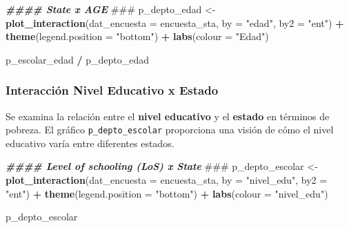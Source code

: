 \documentclass[
  12pt,
]{book}
\newenvironment{Shaded}{\begin{snugshade}}{\end{snugshade}}
\newcommand{\AlertTok}[1]{\textcolor[rgb]{0.94,0.16,0.16}{#1}}
\newcommand{\AttributeTok}[1]{\textcolor[rgb]{0.13,0.29,0.53}{#1}}
\newcommand{\DocumentationTok}[1]{\textcolor[rgb]{0.56,0.35,0.01}{\textbf{\textit{#1}}}}
\newcommand{\FunctionTok}[1]{\textcolor[rgb]{0.13,0.29,0.53}{\textbf{#1}}}
\newcommand{\NormalTok}[1]{#1}
\newcommand{\OtherTok}[1]{\textcolor[rgb]{0.56,0.35,0.01}{#1}}
\newcommand{\SpecialCharTok}[1]{\textcolor[rgb]{0.81,0.36,0.00}{\textbf{#1}}}
\newcommand{\StringTok}[1]{\textcolor[rgb]{0.31,0.60,0.02}{#1}}
\begin{document}
\begin{Shaded}
\begin{Highlighting}[]
\DocumentationTok{\#\#\#\# State x AGE }\AlertTok{\#\#\#}
\NormalTok{p\_depto\_edad }\OtherTok{\textless{}{-}}
  \FunctionTok{plot\_interaction}\NormalTok{(}\AttributeTok{dat\_encuesta =}\NormalTok{ encuesta\_sta,}
                   \AttributeTok{by =} \StringTok{"edad"}\NormalTok{,}
                   \AttributeTok{by2 =} \StringTok{"ent"}\NormalTok{) }\SpecialCharTok{+}
  \FunctionTok{theme}\NormalTok{(}\AttributeTok{legend.position =} \StringTok{"bottom"}\NormalTok{) }\SpecialCharTok{+} \FunctionTok{labs}\NormalTok{(}\AttributeTok{colour =} \StringTok{"Edad"}\NormalTok{)}

\NormalTok{p\_escolar\_edad }\SpecialCharTok{/}\NormalTok{ p\_depto\_edad}
\end{Highlighting}
\end{Shaded}

\hypertarget{interacciuxf3n-nivel-educativo-x-estado}{%
\subsubsection*{Interacción Nivel Educativo x Estado}\label{interacciuxf3n-nivel-educativo-x-estado}}

Se examina la relación entre el \textbf{nivel educativo} y el \textbf{estado} en términos de pobreza. El gráfico \texttt{p\_depto\_escolar} proporciona una visión de cómo el nivel educativo varía entre diferentes estados.

\begin{Shaded}
\begin{Highlighting}[]
\DocumentationTok{\#\#\#\# Level of schooling (LoS) x State }\AlertTok{\#\#\#}
\NormalTok{p\_depto\_escolar }\OtherTok{\textless{}{-}}
  \FunctionTok{plot\_interaction}\NormalTok{(}\AttributeTok{dat\_encuesta =}\NormalTok{ encuesta\_sta,}
                   \AttributeTok{by =} \StringTok{"nivel\_edu"}\NormalTok{,}
                   \AttributeTok{by2 =} \StringTok{"ent"}\NormalTok{) }\SpecialCharTok{+}
  \FunctionTok{theme}\NormalTok{(}\AttributeTok{legend.position =} \StringTok{"bottom"}\NormalTok{) }\SpecialCharTok{+} \FunctionTok{labs}\NormalTok{(}\AttributeTok{colour =} \StringTok{"nivel\_edu"}\NormalTok{)}

\NormalTok{p\_depto\_escolar}
\end{Highlighting}
\end{Shaded}
\end{document}
